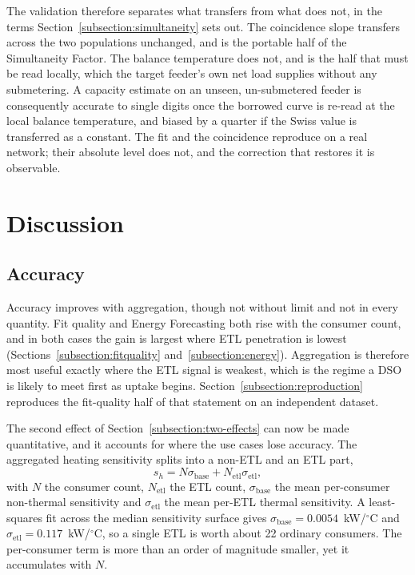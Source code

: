 \documentclass[9pt,journal,a4]{IEEEtran}
\begin{document}
The validation therefore separates what transfers from what does not, in the terms Section~\ref{subsection:simultaneity} sets out. The coincidence slope transfers across the two populations unchanged, and is the portable half of the Simultaneity Factor. The balance temperature does not, and is the half that must be read locally, which the target feeder's own net load supplies without any submetering. A capacity estimate on an unseen, un-submetered feeder is consequently accurate to single digits once the borrowed curve is re-read at the local balance temperature, and biased by a quarter if the Swiss value is transferred as a constant. The fit and the coincidence reproduce on a real network; their absolute level does not, and the correction that restores it is observable.


\section{Discussion}
\label{section:discussion}


\subsection{Accuracy}
\label{subsection:accuracy}

Accuracy improves with aggregation, though not without limit and not in every quantity. Fit quality and Energy Forecasting both rise with the consumer count, and in both cases the gain is largest where ETL penetration is lowest (Sections~\ref{subsection:fitquality} and~\ref{subsection:energy}). Aggregation is therefore most useful exactly where the ETL signal is weakest, which is the regime a DSO is likely to meet first as uptake begins. Section~\ref{subsection:reproduction} reproduces the fit-quality half of that statement on an independent dataset.

The second effect of Section~\ref{subsection:two-effects} can now be made quantitative, and it accounts for where the use cases lose accuracy. The aggregated heating sensitivity splits into a non-ETL and an ETL part,
\begin{equation}
s_h = N \sigma_{\mathrm{base}} + N_{\mathrm{etl}} \sigma_{\mathrm{etl}},
\label{eq:sensitivity-decomposition}
\end{equation}
with $N$ the consumer count, $N_{\mathrm{etl}}$ the ETL count, $\sigma_{\mathrm{base}}$ the mean per-consumer non-thermal sensitivity and $\sigma_{\mathrm{etl}}$ the mean per-ETL thermal sensitivity. A least-squares fit across the median sensitivity surface gives $\sigma_{\mathrm{base}} = 0.0054$~kW/$^\circ$C and $\sigma_{\mathrm{etl}} = 0.117$~kW/$^\circ$C, so a single ETL is worth about 22 ordinary consumers. The per-consumer term is more than an order of magnitude smaller, yet it accumulates with $N$.
\end{document}
